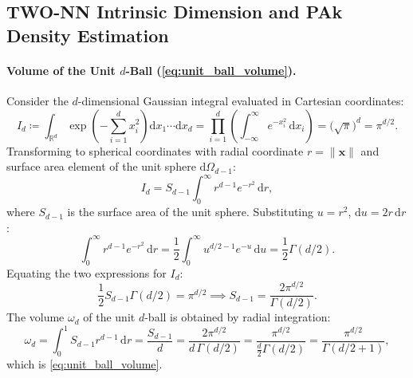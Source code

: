 \subsection{TWO-NN Intrinsic Dimension and PAk Density Estimation}
\label{subsec:supp_pak_derivations}

\paragraph{Volume of the Unit $d$-Ball (\cref{eq:unit_ball_volume}).}
Consider the $d$-dimensional Gaussian integral evaluated in
Cartesian coordinates:
\begin{equation}
  I_d \coloneqq \int_{\mathbb{R}^d} \exp\left(-\sum_{i=1}^d
  x_i^2\right) \mathrm{d}x_1 \cdots \mathrm{d}x_d
  = \prod_{i=1}^d \left( \int_{-\infty}^\infty
  e^{-x_i^2}\,\mathrm{d}x_i \right) = \bigl(\sqrt{\pi}\bigr)^d = \pi^{d/2}.
\end{equation}
Transforming to spherical coordinates with radial coordinate $r =
\|\mathbf{x}\|$ and
surface area element of the unit sphere $\mathrm{d}\Omega_{d-1}$:
\begin{equation}
  I_d = S_{d-1} \int_0^\infty r^{d-1} e^{-r^2}\,\mathrm{d}r,
\end{equation}
where $S_{d-1}$ is the surface area of the unit sphere. Substituting
$u = r^2$, $\mathrm{d}u = 2r\,\mathrm{d}r$:
\begin{equation}
  \int_0^\infty r^{d-1} e^{-r^2}\,\mathrm{d}r =
  \frac{1}{2}\int_0^\infty u^{d/2 - 1} e^{-u}\,\mathrm{d}u =
  \frac{1}{2}\Gamma(d/2).
\end{equation}
Equating the two expressions for $I_d$:
\begin{equation}
  \frac{1}{2} S_{d-1} \Gamma(d/2) = \pi^{d/2} \implies S_{d-1} =
  \frac{2\pi^{d/2}}{\Gamma(d/2)}.
\end{equation}
The volume $\omega_d$ of the unit $d$-ball is obtained by radial integration:
\begin{equation}
  \omega_d = \int_0^1 S_{d-1} r^{d-1}\,\mathrm{d}r =
  \frac{S_{d-1}}{d} = \frac{2\pi^{d/2}}{d \, \Gamma(d/2)} =
  \frac{\pi^{d/2}}{\frac{d}{2}\Gamma(d/2)} = \frac{\pi^{d/2}}{\Gamma(d/2 + 1)},
\end{equation}
which is \cref{eq:unit_ball_volume}.

